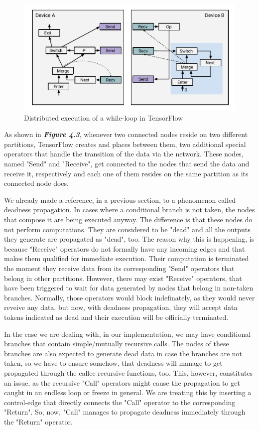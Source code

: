 \documentclass[ack,preface]{dithesis}
\begin{document}
\begin{figure}
\centering
\includegraphics[scale=1.2]{figures/sm_iteration}
\caption{Distributed execution of a while-loop in TensorFlow}
\end{figure}



As shown in \textit{\textbf{Figure 4.3}}, whenever two connected nodes  reside on two different partitions, TensorFlow creates and places between them, two additional special operators that handle the transition of the data via the network. These nodes, named "Send"  and "Receive", get connected to the nodes that send the data and receive it, respectively and each one of them resides on the same partition as its connected node does. 

We already made a reference, in a previous section, to a phenomenon called deadness propagation. In cases where a conditional branch is not taken, the nodes that compose it are being executed anyway. The difference is that these nodes do not perform computations. They are considered to be "dead" and all the outputs they generate are propagated as "dead", too. 
The reason why this is happening, is  because "Receive" operators do not formally have any incoming edges and that makes them qualified for immediate execution. Their computation is terminated the moment they receive data from its corresponding "Send" operators that belong in other partitions. However, there may exist "Receive" operators, that have been triggered to wait for data generated by nodes that belong in non-taken branches. Normally, those operators would block indefinately, as they would never reveive any data, but now, with deadness propagation, they will accept data tokens indicated as dead and their execution will be officially terminated.

In the case we are dealing with, in our implementation, we may have conditional branches that contain simple/mutually recursive calls. The nodes of these branches are  also expected to generate dead data in case the branches are not taken, so we have to ensure somehow, that deadness will manage to get propagated through the callee recursive functions, too. This, however, constitutes an issue, as the recursive "Call" operators might cause the propagation to get caught in an endless loop or freeze in general. We are treating this by inserting a control-edge that directly connects  the "Call" operator to the corresponding "Return". So, now, "Call" manages to propagate deadness immediately through the "Return" operator. 
\end{document}
